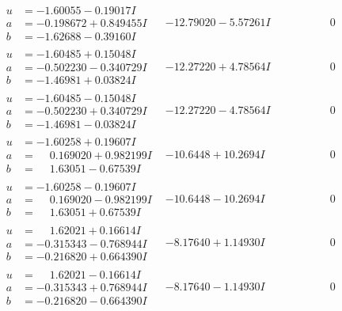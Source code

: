 \documentclass[1p]{elsarticle_modified}
\theoremstyle{definition}
\begin{document}
$$\begin{array}{c|c|c}
\begin{aligned}
u &= -1.60055 - 0.19017 I \\
a &= -0.198672 + 0.849455 I \\
b &= -1.62688 - 0.39160 I\end{aligned}
 & -12.79020 - 5.57261 I & \phantom{-0.000000 } 0 \\ \hline\begin{aligned}
u &= -1.60485 + 0.15048 I \\
a &= -0.502230 - 0.340729 I \\
b &= -1.46981 + 0.03824 I\end{aligned}
 & -12.27220 + 4.78564 I & \phantom{-0.000000 } 0 \\ \hline\begin{aligned}
u &= -1.60485 - 0.15048 I \\
a &= -0.502230 + 0.340729 I \\
b &= -1.46981 - 0.03824 I\end{aligned}
 & -12.27220 - 4.78564 I & \phantom{-0.000000 } 0 \\ \hline\begin{aligned}
u &= -1.60258 + 0.19607 I \\
a &= \phantom{-}0.169020 + 0.982199 I \\
b &= \phantom{-}1.63051 - 0.67539 I\end{aligned}
 & -10.6448 + 10.2694 I & \phantom{-0.000000 } 0 \\ \hline\begin{aligned}
u &= -1.60258 - 0.19607 I \\
a &= \phantom{-}0.169020 - 0.982199 I \\
b &= \phantom{-}1.63051 + 0.67539 I\end{aligned}
 & -10.6448 - 10.2694 I & \phantom{-0.000000 } 0 \\ \hline\begin{aligned}
u &= \phantom{-}1.62021 + 0.16614 I \\
a &= -0.315343 - 0.768944 I \\
b &= -0.216820 + 0.664390 I\end{aligned}
 & -8.17640 + 1.14930 I & \phantom{-0.000000 } 0 \\ \hline\begin{aligned}
u &= \phantom{-}1.62021 - 0.16614 I \\
a &= -0.315343 + 0.768944 I \\
b &= -0.216820 - 0.664390 I\end{aligned}
 & -8.17640 - 1.14930 I & \phantom{-0.000000 } 0 \\ \hline\begin{aligned}

\end{aligned}
\end{array}$$
\end{document}
